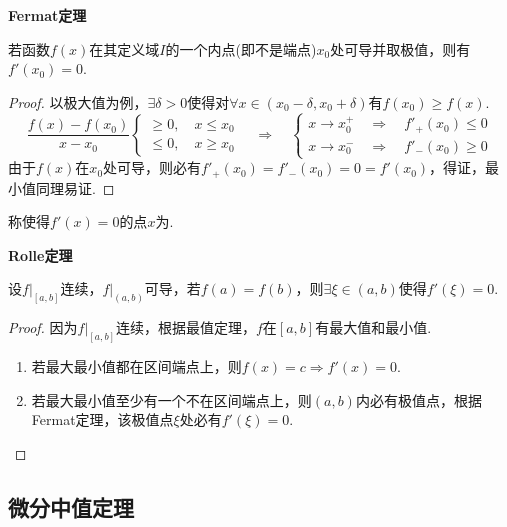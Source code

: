 \begin{theorem}
    \textbf{Fermat定理}

    若函数$f(x)$在其定义域$I$的一个内点(即不是端点)$x_0$处可导并取极值，则有$f'(x_0)=0$.
\end{theorem}

\begin{proof}
    以极大值为例，$\exists \delta > 0$使得对$\forall x \in (x_0-\delta,x_0+\delta)$有$f(x_0)\geqslant f(x)$.
    \[\frac{f(x)-f(x_0)}{x-x_0} \begin{cases}
        \geqslant 0, \quad x \leqslant x_0 \\
        \leqslant 0, \quad x \geqslant x_0
    \end{cases} \quad\Rightarrow\quad \begin{cases}
        x \to x_0^+ \quad\Rightarrow\quad f'_+(x_0) \leqslant 0\\
        x \to x_0^- \quad\Rightarrow\quad f'_-(x_0) \geqslant 0
    \end{cases}\]
    由于$f(x)$在$x_0$处可导，则必有$f'_+(x_0) = f'_-(x_0) = 0 = f'(x_0)$，得证，最小值同理易证.
\end{proof}

\begin{definition}
    称使得$f'(x)=0$的点$x$为.
\end{definition}

\begin{theorem}
    \textbf{Rolle定理}

    设$\left.f\right|_{[a,b]}$连续，$\left.f\right|_{(a,b)}$可导，若$f(a)=f(b)$，则$\exists \xi \in (a,b)$使得$f'(\xi)=0$.
\end{theorem}

\begin{proof}
    因为$\left.f\right|_{[a,b]}$连续，根据最值定理，$f$在$[a,b]$有最大值和最小值.
    \begin{enumerate}[circ]
        \item 若最大最小值都在区间端点上，则$f(x)=c\Rightarrow f'(x)=0$.
        \item 若最大最小值至少有一个不在区间端点上，则$(a,b)$内必有极值点，根据Fermat定理，该极值点$\xi$处必有$f'(\xi)=0$.
    \end{enumerate}
\end{proof}


\subsection{微分中值定理}
